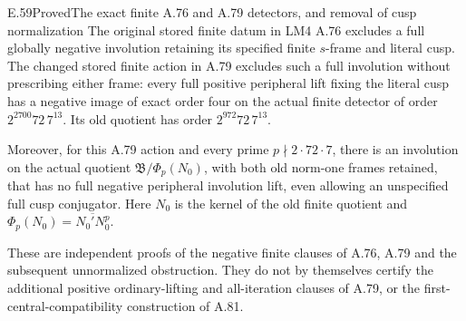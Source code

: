 \begin{result}{E.59}{Proved}{The exact finite A.76 and A.79 detectors, and removal of cusp normalization}
The original stored finite datum in LM4 A.76 excludes a full globally
negative involution retaining its specified finite \(s\)-frame and
literal cusp. The changed stored finite action in A.79 excludes such
a full involution without prescribing either frame: every full positive
peripheral lift fixing the literal cusp has a negative image of exact
order four on the actual finite detector of order
\(2^{2700}72\,7^{13}\). Its old quotient has order
\(2^{972}72\,7^{13}\).

Moreover, for this A.79 action and every prime
\(p\nmid2\cdot72\cdot7\), there is an involution on the actual
quotient \(\mathfrak B/\Phi_p(N_0)\), with both old norm-one
frames retained, that has no full negative peripheral involution lift,
even allowing an unspecified full cusp conjugator.
Here \(N_0\) is the kernel of the old finite quotient and
\(\Phi_p(N_0)=\overline{N_0'N_0^p}\).

These are independent proofs of the negative finite clauses of A.76,
A.79 and the subsequent unnormalized obstruction. They do not by
themselves certify the additional positive ordinary-lifting and
all-iteration clauses of A.79, or the first-central-compatibility
construction of A.81.
\end{result}
